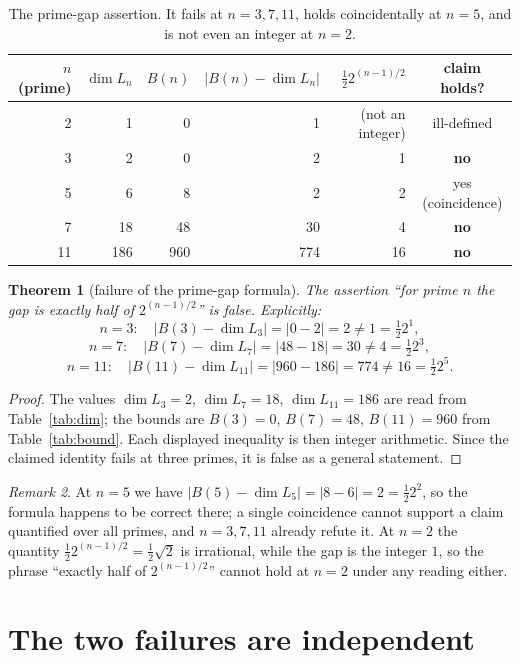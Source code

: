 \documentclass[11pt]{article}
\newtheorem{theorem}{Theorem}
\theoremstyle{definition}
\theoremstyle{remark}
\newtheorem{remark}[theorem]{Remark}
\begin{document}
\begin{table}[h]
\centering
\begin{tabular}{r|r|r|r|r|c}
$n$ (prime) & $\dim L_n$ & $B(n)$ & $|B(n)-\dim L_n|$ &
$\tfrac12 2^{(n-1)/2}$ & claim holds? \\
\hline
2  & 1   & 0   & 1   & (not an integer) & ill-defined \\
3  & 2   & 0   & 2   & 1   & \textbf{no} \\
5  & 6   & 8   & 2   & 2   & yes (coincidence) \\
7  & 18  & 48  & 30  & 4   & \textbf{no} \\
11 & 186 & 960 & 774 & 16  & \textbf{no} \\
\end{tabular}
\caption{The prime-gap assertion. It fails at $n = 3, 7, 11$, holds
coincidentally at $n = 5$, and is not even an integer at $n = 2$.}
\label{tab:gap}
\end{table}

\begin{theorem}[failure of the prime-gap formula]
\label{thm:Bfails}
The assertion ``for prime $n$ the gap is exactly half of $2^{(n-1)/2}$'' is false.
Explicitly:
\[
n=3:\quad |B(3)-\dim L_3| = |0-2| = 2 \ne 1 = \tfrac12 2^{1},
\]
\[
n=7:\quad |B(7)-\dim L_7| = |48-18| = 30 \ne 4 = \tfrac12 2^{3},
\]
\[
n=11:\quad |B(11)-\dim L_{11}| = |960-186| = 774 \ne 16 = \tfrac12 2^{5}.
\]
\end{theorem}

\begin{proof}
The values $\dim L_3 = 2$, $\dim L_7 = 18$, $\dim L_{11} = 186$ are read from
Table~\ref{tab:dim}; the bounds are
$B(3) = 0$, $B(7) = 48$, $B(11) = 960$ from Table~\ref{tab:bound}. Each displayed
inequality is then integer arithmetic. Since the claimed identity fails at three
primes, it is false as a general statement.
\end{proof}

\begin{remark}
At $n = 5$ we have $|B(5)-\dim L_5| = |8-6| = 2 = \tfrac12 2^{2}$, so the formula
happens to be correct there; a single coincidence cannot support a claim quantified
over all primes, and $n = 3, 7, 11$ already refute it. At $n = 2$ the quantity
$\tfrac12 2^{(n-1)/2} = \tfrac12\sqrt2$ is irrational, while the gap is the integer
$1$, so the phrase ``exactly half of $2^{(n-1)/2}$'' cannot hold at $n = 2$ under
any reading either.
\end{remark}

\section{The two failures are independent}
\end{document}
